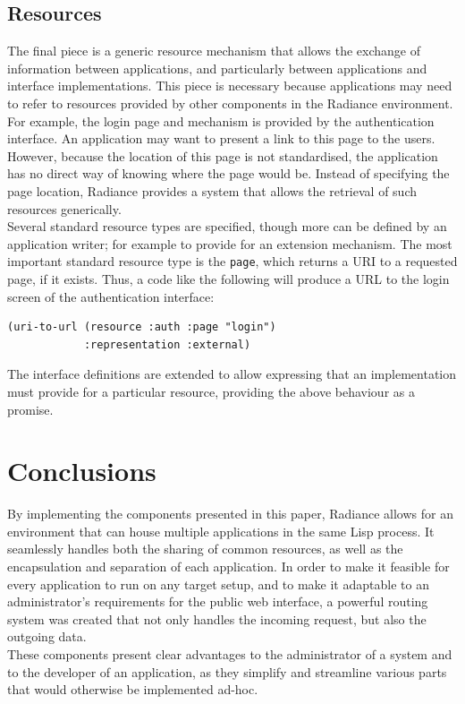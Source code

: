 \documentclass{sig-alternate}
\begin{document}
\subsection{Resources}
The final piece is a generic resource mechanism that allows the exchange of information between applications, and particularly between applications and interface implementations. This piece is necessary because applications may need to refer to resources provided by other components in the Radiance environment. For example, the login page and mechanism is provided by the authentication interface. An application may want to present a link to this page to the users. However, because the location of this page is not standardised, the application has no direct way of knowing where the page would be. Instead of specifying the page location, Radiance provides a system that allows the retrieval of such resources generically. \\

Several standard resource types are specified, though more can be defined by an application writer; for example to provide for an extension mechanism. The most important standard resource type is the \texttt{page}, which returns a URI to a requested page, if it exists. Thus, a code like the following will produce a URL to the login screen of the authentication interface:

\begin{verbatim}
(uri-to-url (resource :auth :page "login")
            :representation :external)
\end{verbatim}

The interface definitions are extended to allow expressing that an implementation must provide for a particular resource, providing the above behaviour as a promise.

\section{Conclusions}
By implementing the components presented in this paper, Radiance allows for an environment that can house multiple applications in the same Lisp process. It seamlessly handles both the sharing of common resources, as well as the encapsulation and separation of each application. In order to make it feasible for every application to run on any target setup, and to make it adaptable to an administrator's requirements for the public web interface, a powerful routing system was created that not only handles the incoming request, but also the outgoing data. \\

These components present clear advantages to the administrator of a system and to the developer of an application, as they simplify and streamline various parts that would otherwise be implemented ad-hoc.


\end{document}
